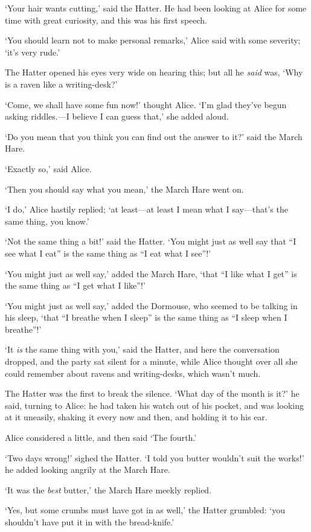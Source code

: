 \documentclass[12pt,openany]{memoir}
\begin{document}
`Your hair wants cutting,' said the Hatter. He had been looking at Alice for some time with great curiosity, and this was his first speech.

`You should learn not to make personal remarks,' Alice said with some severity; `it's very rude.'

The Hatter opened his eyes very wide on hearing this; but all he \textit{said} was, `Why is a raven like a writing-desk?'

`Come, we shall have some fun now!' thought Alice. `I'm glad they've begun asking riddles.---I believe I can guess that,' she added aloud.

`Do you mean that you think you can find out the answer to it?' said the March Hare.

`Exactly so,' said Alice.

`Then you should say what you mean,' the March Hare went on.

`I do,' Alice hastily replied; `at least---at least I mean what I say---that's the same thing, you know.'

`Not the same thing a bit!' said the Hatter. `You might just as well say that ``I see what I eat'' is the same thing as ``I eat what I see''!'

`You might just as well say,' added the March Hare, `that ``I like what I get'' is the same thing as ``I get what I like''!'

`You might just as well say,' added the Dormouse, who seemed to be talking in his sleep, `that ``I breathe when I sleep'' is the same thing as ``I sleep when I breathe''!'

`It \textit{is} the same thing with you,' said the Hatter, and here the conversation dropped, and the party sat silent for a minute, while Alice thought over all she could remember about ravens and writing-desks, which wasn't much.

The Hatter was the first to break the silence. `What day of the month is it?' he said, turning to Alice: he had taken his watch out of his pocket, and was looking at it uneasily, shaking it every now and then, and holding it to his ear.

Alice considered a little, and then said `The fourth.'

`Two days wrong!' sighed the Hatter. `I told you butter wouldn't suit the works!' he added looking angrily at the March Hare.

`It was the \textit{best} butter,' the March Hare meekly replied.

`Yes, but some crumbs must have got in as well,' the Hatter grumbled: `you shouldn't have put it in with the bread-knife.'
\end{document}

